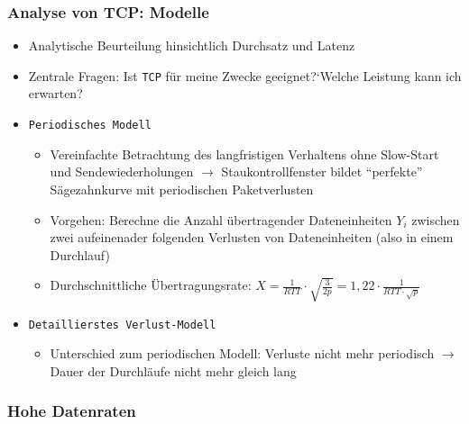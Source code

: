 \subsubsection{Analyse von TCP: Modelle}
\begin{itemize}
	\item Analytische Beurteilung hinsichtlich Durchsatz und Latenz
	\item Zentrale Fragen: Ist \texttt{TCP} für meine Zwecke geeignet?`Welche Leistung kann ich erwarten?
	\item \texttt{Periodisches Modell}
	\begin{itemize}
		\item Vereinfachte Betrachtung des langfristigen Verhaltens ohne Slow-Start und Sendewiederholungen \(\rightarrow\) Staukontrollfenster bildet "`perfekte"' Sägezahnkurve mit periodischen Paketverlusten
		\item Vorgehen: Berechne die Anzahl übertragender Dateneinheiten \(Y_i\) zwischen zwei aufeinenader folgenden Verlusten von Dateneinheiten (also in einem Durchlauf)
		\item Durchschnittliche Übertragungsrate: \(X=\frac{1}{RTT}\cdot\sqrt{\frac{3}{2p}} = 1,22 \cdot \frac{1}{RTT\cdot\sqrt{p}}\)
	\end{itemize}
	\item \texttt{Detaillierstes Verlust-Modell}
	\begin{itemize}
		\item Unterschied zum periodischen Modell: Verluste nicht mehr periodisch \(\rightarrow\) Dauer der Durchläufe nicht mehr gleich lang
	\end{itemize}
\end{itemize}

\subsubsection{Hohe Datenraten}

